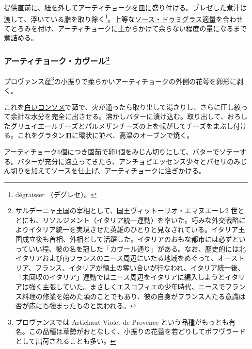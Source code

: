 \begin{recette}
提供直前に、紐を外してアーティチョークを皿に盛り付ける。ブレゼした煮汁は漉して、浮いている脂を取り除く\footnote{dégraisser
  （デグレセ）。}。上等な\protect\hyperlink{sauce-demi-glace}{ソース・ドゥミグラス}適量を合わせてとろみを付け、アーティチョークに上からかけて余らない程度の量になるまで煮詰める。

\atoaki{}

\hypertarget{artichauts-cavour}{%
\subsubsection[アーティチョーク・カヴール]{\texorpdfstring{アーティチョーク・カヴール\footnote{サルデーニャ王国の宰相として、国王ヴィットーリオ・エマヌエーレ2
  世ととにも、リソルジメント（イタリア統一運動）を率いた。巧みな外交戦略によりイタリア統一を実現させた英雄のひとりと見なされている。イタリア王国成立後も首相、外相として活躍した。イタリアのおもな都市には必ずといっていい程、彼の名を冠した「カヴール通り」がある。なお、歴史的には北イタリアおよび南フランスのニース周辺にいたる地域をめぐって、オーストリア、フランス、イタリアが領土の奪い合いが行なわれ、イタリア統一後、「未回収のイタリア」運動ではニース周辺をイタリアに編入しようとイタリアは強く主張していた。まさしくエスコフィエの少年時代、ニースでフランス料理の修業を始めた頃のことでもあり、彼の自身がフランス人たる意識は否が応にも強まったものと思われる。}}{アーティチョーク・カヴール}}\label{artichauts-cavour}}



プロヴァンス産\footnote{プロヴァンスでは Artichaut Violet de Provence
  という品種がもっとも有名。この品種は草勢がおとなしく、小振りの花蕾を若どりしてポワヴラードとして出荷されることも多い。}の小振りで柔らかいアーティチョークの外側の花萼を卵形に剥く。

これを\protect\hyperlink{consomme-blanc}{白いコンソメ}で茹で、火が通ったら取り出して湯きりし、さらに圧し絞って余計な水分を完全に出させる。溶かしバターに漬け込む。取り出して、おろしたグリュイエールチーズとパルメザンチーズの上を転がしてチーズをまぶし付ける。これをグラタン皿に環状に並べ、高温のオーブンで焼く。

アーティチョーク6個につき固茹で卵1個をみじん切りにして、バターでソテーする。バターが充分に泡立ってきたら、アンチョビエッセンス少々とパセリのみじん切りを加えてソースを仕上げ、アーティチョークに注ぎかける。


\end{recette}
